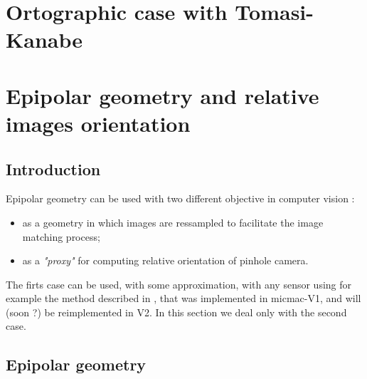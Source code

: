 


\section{Ortographic case with Tomasi-Kanabe}


\section{Epipolar geometry and relative images orientation}

\subsection{Introduction}

Epipolar geometry can be used with two different objective 
in computer vision :

\begin{itemize}
   \item as a geometry in which images are ressampled to facilitate
         the image matching process;

   \item as a \emph{"proxy"} for computing relative orientation of pinhole camera.
\end{itemize}

The firts case can be used, with some approximation, with any sensor
using for example the method described in \cite{MPD-ER-EPIP-2021},
that was implemented in micmac-V1, and will (soon ?) be reimplemented in V2.
In this section we deal only with the second case.


\subsection{Epipolar geometry}


